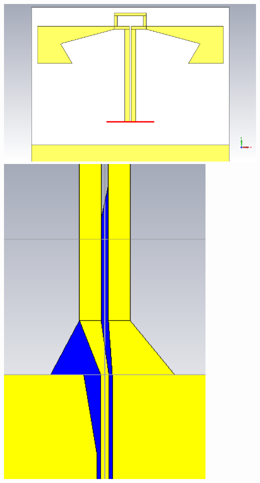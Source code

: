 \documentclass[aspectratio=43]{beamer}
\begin{document}
\begin{frame}
\begin{columns}
				\centering
				\includegraphics[width=\textwidth]{bifa_broadband_3D.png}\\[3ex]
				\includegraphics[width=0.8\textwidth]{balun_3.png}
		\end{columns}
\end{frame}
\end{document}
